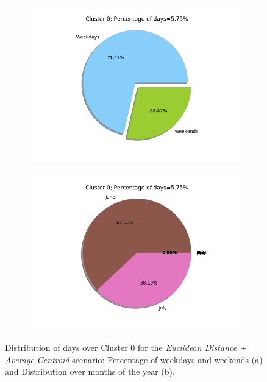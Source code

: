 \documentclass[9pt,journal,compsoc]{IEEEtran}
\begin{document}
\begin{figure}[H]
	\centering
	\begin{subfigure}{0.8\columnwidth}
		\includegraphics[scale=0.4]{images/percent_week_raw_average_4.png}
		\caption{}
	\end{subfigure}\hfill%
	
	\begin{subfigure}{0.8\columnwidth}
		\includegraphics[scale=0.4]{images/percent_months_raw_average_4.png}
		\caption{}
	\end{subfigure}%
	\caption{Distribution of days over Cluster $0$ for the \emph{Euclidean Distance + Average Centroid} scenario: Percentage of weekdays and weekends (a) and Distribution over months of the year (b).}
	\label{distribution_euclidean_average_4clusters}
\end{figure}
\end{document}
